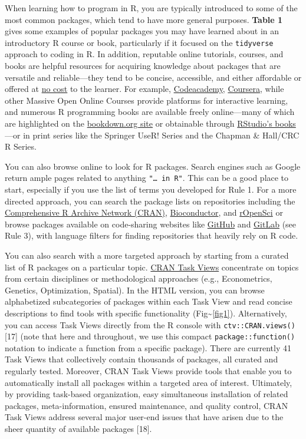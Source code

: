 \documentclass[10pt,letterpaper]{article}
\begin{document}
When learning how to program in R, you are typically introduced to some
of the most common packages, which tend to have more general purposes.
\textbf{Table 1} gives some examples of popular packages you may have
learned about in an introductory R course or book, particularly if it
focused on the \texttt{tidyverse} approach to coding in R. In addition,
reputable online tutorials, courses, and books are helpful resources for
acquiring knowledge about packages that are versatile and
reliable---they tend to be concise, accessible, and either affordable or
offered at \href{https://committedtotape.shinyapps.io/freeR/}{no cost}
to the learner. For example,
\href{https://www.codecademy.com/learn/learn-r}{Codeacademy},
\href{https://www.coursera.org/learn/r-programming}{Coursera}, while
other Massive Open Online Courses provide platforms for interactive
learning, and numerous R programming books are available freely
online---many of which are highlighted on the
\href{https://bookdown.org/}{bookdown.org site} or obtainable through
\href{https://rstudio.com/resources/books/}{RStudio's books}---or in
print series like the Springer UseR! Series and the Chapman \& Hall/CRC
R Series.

You can also browse online to look for R packages. Search engines such
as Google return ample pages related to anything
\texttt{"\ldots{}\ in\ R"}. This can be a good place to start,
especially if you use the list of terms you developed for Rule 1. For a
more directed approach, you can search the package lists on repositories
including the \href{https://cran.r-project.org/}{Comprehensive R Archive
Network (CRAN)}, \href{https://www.bioconductor.org/}{Bioconductor}, and
\href{https://ropensci.org/}{rOpenSci} or browse packages available on
code-sharing websites like \href{https://github.com/}{GitHub} and
\href{https://about.gitlab.com/}{GitLab} (see Rule 3), with language
filters for finding repositories that heavily rely on R code.

You can also search with a more targeted approach by starting from a
curated list of R packages on a particular topic.
\href{https://cran.r-project.org/web/views/}{CRAN Task Views}
concentrate on topics from certain disciplines or methodological
approaches (e.g., Econometrics, Genetics, Optimization, Spatial). In the
HTML version, you can browse alphabetized subcategories of packages
within each Task View and read concise descriptions to find tools with
specific functionality (Fig\textasciitilde{}\ref{fig1}). Alternatively,
you can access Task Views directly from the R console with
\texttt{ctv::CRAN.views()} {[}17{]} (note that here and throughout, we
use this compact \texttt{package::function()} notation to indicate a
function from a specific package). There are currently 41 Task Views
that collectively contain thousands of packages, all curated and
regularly tested. Moreover, CRAN Task Views provide tools that enable
you to automatically install all packages within a targeted area of
interest. Ultimately, by providing task-based organization, easy
simultaneous installation of related packages, meta-information, ensured
maintenance, and quality control, CRAN Task Views address several major
user-end issues that have arisen due to the sheer quantity of available
packages {[}18{]}.
\end{document}

